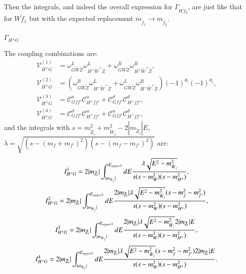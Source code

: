 \documentclass[final,3p,times]{elsarticle}
\begin{document}
Then the integrals, and indeed the overall expression for $\Gamma_{W \tilde{f}_2}$, are just like that for $W \tilde{f}_1$ but with the expected replacement $m_{\tilde{f}_1} \rightarrow m_{\tilde{f}_2}$.

\textbf{\underline{$\Gamma_{H^{\pm} G}$}}

The coupling combinations are:
\begin{align}
\mathcal{V}_{H^{\pm} G}^{(1)} &= \omega_{G \tilde{W} \tilde{Z}}^L  \omega_{H^+ \tilde{W}^+ \tilde{Z}}^L + \omega_{G \tilde{W} \tilde{Z}}^R  \omega_{H^+ \tilde{W}^+ \tilde{Z}}^R, \\
\mathcal{V}_{H^{\pm} G}^{(2)} &= (\omega_{G \tilde{W} \tilde{Z}}^R  \omega_{H^+ \tilde{W}^+ \tilde{Z}}^L + \omega_{G \tilde{W} \tilde{Z}}^L  \omega_{H^+ \tilde{W}^+ \tilde{Z}}^R)(-1)^{\theta_i}(-1)^{\theta_j}, \\
\mathcal{V}_{H^{\pm} G}^{(3)} &= \mathcal{C}_{G f f'}^u  \mathcal{C}_{H^+ f f'}^u + \mathcal{C}_{G f f'}^d  \mathcal{C}_{H^+ f f'}^d, \\
\mathcal{V}_{H^{\pm} G}^{(4)} &= \mathcal{C}_{G f f'}^d  \mathcal{C}_{H^+ f f'}^u + \mathcal{C}_{G f f'}^u  \mathcal{C}_{H^+ f f'}^d,
\end{align}
and the integrals with $s = m_{\tilde{Z}_i}^2 + m_{\tilde{W}_j}^2 - 2|m_{\tilde{Z}_i}|E$, $\lambda = \sqrt{(s-(m_{f}+m_{f'})^2)(s-(m_{f}-m_{f'})^2)}$ are:
\begin{equation}
I_{H^{\pm} G}^{1} = 2|m_{\tilde{Z}_i}| \int_{|m_{\tilde{W}_j}|}^{E_{upper3}} dE  {\lambda \sqrt{E^2 - m_{\tilde{W}_j}^2}   \over s(s-m_{W}^2)(s-m_{H^{\pm}}^2)},
\end{equation}
\begin{equation}
I_{H^{\pm} G}^{2} = 2|m_{\tilde{Z}_i}| \int_{|m_{\tilde{W}_j}|}^{E_{upper3}} dE {2|m_{\tilde{Z}_i}| \lambda \sqrt{E^2-m_{\tilde{W}_j}^2} (s- m_{f}^2 - m_{f'}^2) \over s(s-m_{W}^2)(s-m_{H^{\pm}}^2)},
\end{equation}
\begin{equation}
I_{H^{\pm} G}^{3} = 2|m_{\tilde{Z}_i}| \int_{|m_{\tilde{W}_j}|}^{E_{upper3}} dE {2|m_{\tilde{Z}_i}| \lambda \sqrt{E^2-m_{\tilde{W}_j}^2} 2|m_{\tilde{Z}_i}|E \over s(s-m_{W}^2)(s-m_{H^{\pm}}^2)},
\end{equation}
\begin{equation}
I_{H^{\pm} G}^{4} = 2|m_{\tilde{Z}_i}| \int_{|m_{\tilde{W}_j}|}^{E_{upper3}} dE {2|m_{\tilde{Z}_i}| \lambda \sqrt{E^2-m_{\tilde{W}_j}^2} (s- m_{f}^2 - m_{f'}^2) 2|m_{\tilde{Z}_i}|E \over s(s-m_{W}^2)(s-m_{H^{\pm}}^2)}.
\end{equation}
\end{document}
